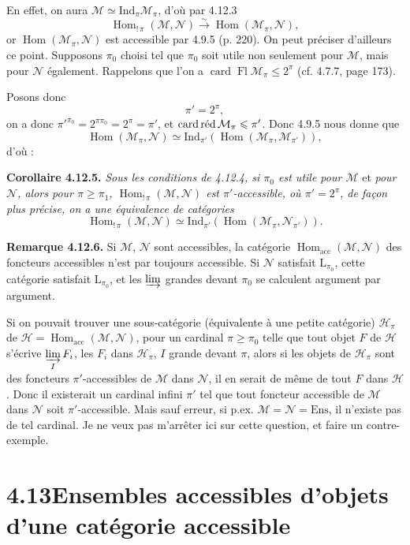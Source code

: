 \documentclass[11pt]{article}
\newcommand{\msp}[1]{\marginpar{\footnotesize [#1]}}
\newcommand{\Ind}{\mathrm{Ind}}
\newcommand{\Fl}{\operatorname{Fl}}
\newcommand{\card}{\operatorname{card}}
\newcommand{\Hom}{\operatorname{Hom}}
\newcommand{\M}{\mathcal{M}}
\newcommand{\N}{\mathcal{N}}
\newcommand{\cH}{\mathcal{H}}
\newcommand{\red}{\mathop{\textup{réd}}\nolimits}
\begin{document}
En effet, on aura $\M \simeq \Ind_\pi\M_\pi$, d'où par 4.12.3
\[
\Hom_{!\,\pi}(\M,\N) \xrightarrow{\sim} \Hom(\M_\pi,\N) ,
\]
or $\Hom(\M_\pi,\N)$ est accessible par 4.9.5 (p. 220). On peut préciser d'ailleurs ce point. Supposons $\pi_0$ choisi tel que $\pi_0$ soit utile non seulement pour $\M$, mais pour $\N$ également. Rappelons que l'on a $\card\Fl\M_\pi \leqslant 2^\pi$ (cf. 4.7.7, page 173).

\msp{page 279}
Posons donc
\[
\pi' = 2^\pi ,
\]
on a donc $\pi'^{\pi_0} = 2^{\pi\pi_0} = 2^\pi = \pi'$, et $\card\red\M_\pi \leqslant \pi'$. Donc 4.9.5 nous donne que
\[
\Hom(\M_\pi,\N) \simeq \Ind_{\pi'}(\Hom(\M_\pi,\M_{\pi'})) , %
\]
d'où :

\textbf{Corollaire 4.12.5.} \textit{Sous les conditions de 4.12.4, si $\pi_0$ est utile pour $\M$} et \textit{pour $\N$, alors pour $\pi \geqslant \pi_1$, $\Hom_{!\,\pi}(\M,\N)$ est $\pi'$-accessible, où $\pi' = 2^\pi$, de façon plus précise, on a une équivalence de catégories}
\[
\Hom_{!\,\pi}(\M,\N) \simeq \Ind_{\pi'}(\Hom(\M_\pi,\N_{\pi'})) .
\]

\textbf{Remarque 4.12.6.} Si $\M$, $\N$ sont accessibles, la catégorie $\Hom_{\mathrm{acc}}(\M,\N)$ des foncteurs accessibles n'est par toujours accessible. Si $\N$ satisfait $\mathrm{L}_{\pi_0}$, cette catégorie satisfait $\mathrm{L}_{\pi_0}$, %
et les $\varinjlim$ grandes devant $\pi_0$ se calculent argument par argument.

\msp{page 280}
Si on pouvait trouver une sous-catégorie (équivalente à une petite catégorie) $\cH_\pi$ de $\cH = \Hom_{\mathrm{acc}}(\M,\N)$, pour un cardinal $\pi \geqslant \pi_0$ telle que tout objet $F$ de $\cH$ s'écrive $\varinjlim\limits_{I} F_i$, les $F_i$ dans $\cH_\pi$, $I$ grande devant $\pi$, alors si les objets de $\cH_\pi$ sont des foncteurs $\pi'$-accessibles de $\M$ dans $\N$, il en serait de même de tout $F$ dans $\cH$. Donc il existerait un cardinal infini $\pi'$ tel que tout foncteur accessible de $\M$ dans $\N$ soit $\pi'$-accessible. Mais sauf erreur, si p.ex. $\M = \N = \mathrm{Ens}$, il n'existe pas de tel cardinal. Je ne veux pas m'arrêter ici sur cette question, et faire un contre-exemple.

\msp{page 281}

\section*{4.13\quad Ensembles accessibles d'objets d'une catégorie accessible}
\end{document}

